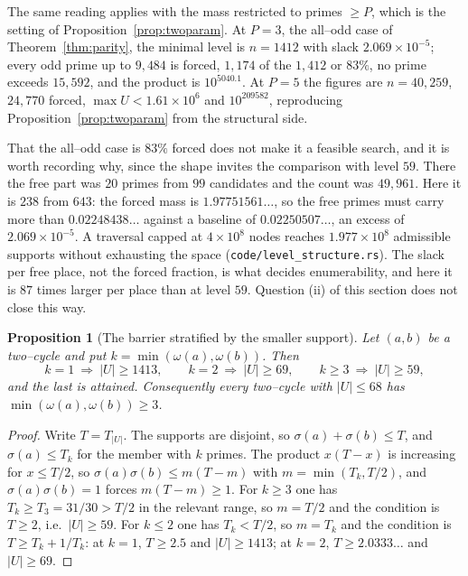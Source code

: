 \documentclass[11pt]{article}
\newtheorem{proposition}[theorem]{Proposition}
\theoremstyle{definition}
\begin{document}
The same reading applies with the mass restricted to primes $\ge P$, which is the setting of
Proposition~\ref{prop:twoparam}. At $P=3$, the all--odd case of Theorem~\ref{thm:parity}, the
minimal level is $n=1412$ with slack $2.069\times10^{-5}$; every odd prime up to $9{,}484$ is forced,
$1{,}174$ of the $1{,}412$ or $83\%$, no prime exceeds $15{,}592$, and the product is $10^{5040.1}$.
At $P=5$ the figures are $n=40{,}259$, $24{,}770$ forced, $\max U<1.61\times10^{6}$ and $10^{209582}$,
reproducing Proposition~\ref{prop:twoparam} from the structural side.

That the all--odd case is $83\%$ forced does not make it a feasible search, and it is worth
recording why, since the shape invites the comparison with level $59$. There the free part was $20$
primes from $99$ candidates and the count was $49{,}961$. Here it is $238$ from $643$: the forced
mass is $1.97751561\ldots$, so the free primes must carry more than $0.02248438\ldots$ against a
baseline of $0.02250507\ldots$, an excess of $2.069\times10^{-5}$. A traversal capped at
$4\times10^{8}$ nodes reaches $1.977\times10^{8}$ admissible supports without exhausting the space
\textup{(\texttt{code/level\_structure.rs})}. The slack per free place, not the forced fraction, is
what decides enumerability, and here it is $87$ times larger per place than at level $59$. Question
(ii) of this section does not close this way.

\begin{proposition}[The barrier stratified by the smaller support]\label{prop:split}
Let $(a,b)$ be a two--cycle and put $k=\min(\omega(a),\omega(b))$. Then
\[ k=1\ \Rightarrow\ |U|\ge1413, \qquad k=2\ \Rightarrow\ |U|\ge69, \qquad
   k\ge3\ \Rightarrow\ |U|\ge59, \]
and the last is attained. Consequently every two--cycle with $|U|\le68$ has
$\min(\omega(a),\omega(b))\ge3$.
\end{proposition}
\begin{proof}
Write $T=T_{|U|}$. The supports are disjoint, so $\sigma(a)+\sigma(b)\le T$, and
$\sigma(a)\le T_k$ for the member with $k$ primes. The product $x(T-x)$ is increasing for
$x\le T/2$, so $\sigma(a)\sigma(b)\le m(T-m)$ with $m=\min(T_k,T/2)$, and $\sigma(a)\sigma(b)=1$
forces $m(T-m)\ge1$. For $k\ge3$ one has $T_k\ge T_3=31/30>T/2$ in the relevant range, so $m=T/2$
and the condition is $T\ge2$, i.e.\ $|U|\ge59$. For $k\le2$ one has $T_k<T/2$, so $m=T_k$ and the
condition is $T\ge T_k+1/T_k$: at $k=1$, $T\ge2.5$ and $|U|\ge1413$; at $k=2$, $T\ge2.0333\ldots$ and
$|U|\ge69$.
\end{proof}
\end{document}
